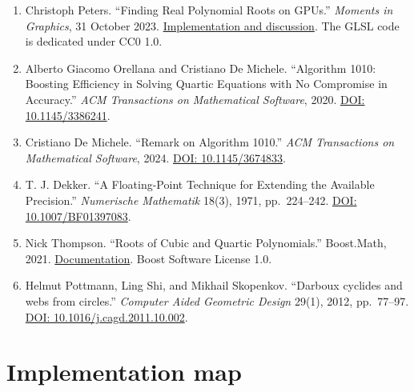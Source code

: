 \documentclass[11pt,a4paper]{article}
\begin{document}
\begin{enumerate}
  manifold handbook: basic geometry and computational aspects.''
  \emph{Advances in Computational Mathematics} 50, Article 6, 2024.
  \href{https://doi.org/10.1007/s10444-023-10090-8}{DOI:
  10.1007/s10444-023-10090-8}.
\item
  Christoph Peters. ``Finding Real Polynomial Roots on GPUs.''
  \emph{Moments in Graphics}, 31 October 2023.
  \href{https://momentsingraphics.de/GPUPolynomialRoots.html}{Implementation
  and discussion}. The GLSL code is dedicated under CC0 1.0.
\item
  Alberto Giacomo Orellana and Cristiano De Michele. ``Algorithm 1010:
  Boosting Efficiency in Solving Quartic Equations with No Compromise in
  Accuracy.'' \emph{ACM Transactions on Mathematical Software}, 2020.
  \href{https://doi.org/10.1145/3386241}{DOI: 10.1145/3386241}.
\item
  Cristiano De Michele. ``Remark on Algorithm 1010.'' \emph{ACM
  Transactions on Mathematical Software}, 2024.
  \href{https://doi.org/10.1145/3674833}{DOI: 10.1145/3674833}.
\item
  T. J. Dekker. ``A Floating-Point Technique for Extending the Available
  Precision.'' \emph{Numerische Mathematik} 18(3), 1971, pp.~224--242.
  \href{https://doi.org/10.1007/BF01397083}{DOI: 10.1007/BF01397083}.
\item
  Nick Thompson. ``Roots of Cubic and Quartic Polynomials.'' Boost.Math,
  2021.
  \href{https://www.boost.org/doc/libs/latest/libs/math/doc/html/math_toolkit/quartic_roots.html}{Documentation}.
  Boost Software License 1.0.
\item
  Helmut Pottmann, Ling Shi, and Mikhail Skopenkov. ``Darboux cyclides
  and webs from circles.'' \emph{Computer Aided Geometric Design} 29(1),
  2012, pp.~77--97.
  \href{https://doi.org/10.1016/j.cagd.2011.10.002}{DOI:
  10.1016/j.cagd.2011.10.002}.
\end{enumerate}

\section*{Implementation map}\label{implementation-map}
\end{document}
